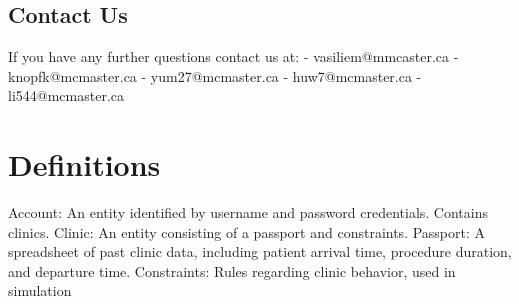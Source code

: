 \documentclass[12pt]{article}
\begin{document}
\subsection{Contact Us}
If you have any further questions contact us at:
\medbreak
- vasiliem@mmcaster.ca
\medbreak
- knopfk@mcmaster.ca
\medbreak
- yum27@mcmaster.ca
\medbreak
- huw7@mcmaster.ca
\medbreak
- li544@mcmaster.ca

\section{Definitions}
Account: An entity identified by username and password credentials. Contains clinics.
\medbreak\medbreak
Clinic: An entity consisting of a passport and constraints.
\medbreak\medbreak
Passport: A spreadsheet of past clinic data, including patient arrival time, procedure duration, and departure time.
\medbreak\medbreak
Constraints: Rules regarding clinic behavior, used in simulation
\end{document}
